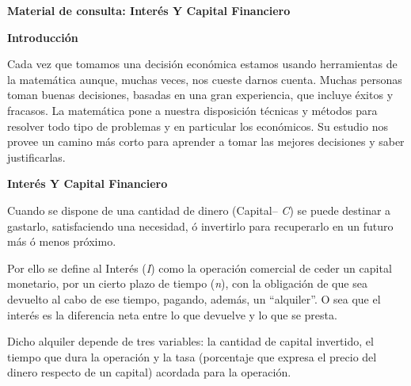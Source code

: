 \documentclass[12pt]{examdesign}
\theoremstyle{plain}
\theoremstyle{definition}
\theoremstyle{remark}
\begin{document}
    \begin{endmatter}
    	\vspace{.2cm}
    	\centerline{\LARGE \textcolor{upforestgreen}{\textbf{Material de consulta: Interés Y Capital Financiero}}}
    	\vspace{.2cm}
    	\textbf{Introducción}
    	
    	Cada vez que tomamos una decisión económica estamos usando herramientas de la matemática aunque, muchas veces, nos cueste darnos cuenta. Muchas personas toman buenas decisiones, basadas en una gran experiencia, que incluye éxitos y fracasos. La matemática pone a nuestra disposición técnicas y métodos para resolver todo tipo de problemas y en particular los económicos. Su estudio nos provee un camino más corto para aprender a tomar las mejores decisiones y saber justificarlas.
    	
    	\textbf{Interés Y Capital Financiero}
    	
    	Cuando se dispone de una cantidad de dinero (Capital– \textit{C}) se puede destinar a gastarlo, satisfaciendo una necesidad, ó invertirlo para recuperarlo en un futuro más ó menos próximo.
    	
    	Por ello se define al Interés (\textit{I}) como la operación comercial de ceder un capital monetario, por un cierto plazo de tiempo (\textit{n}), con la obligación de que sea devuelto al cabo de ese tiempo, pagando, además, un ``alquiler''. O sea que el interés es la diferencia neta entre lo que devuelve y lo que se presta.
    	
    	Dicho alquiler depende de tres variables: la cantidad de capital invertido, el tiempo que dura la operación y la tasa (porcentaje que expresa el precio del dinero respecto de un capital) acordada para la operación.
    	

\end{endmatter}
\end{document}
